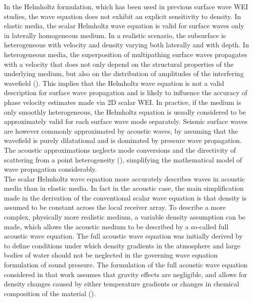 \documentclass{article}
\begin{document}
	In the Helmholtz formulation, which has been used in previous surface wave WEI studies, the wave equation does not exhibit an explicit sensitivity to density. In elastic media, the scalar Helmholtz wave equation is valid for surface waves only in laterally homogeneous medium. In a realistic scenario, the subsurface is heterogeneous with velocity and density varying both laterally and with depth. In heterogeneous media, the superposition of multipathing surface waves propagates with a velocity that does not only depend on the structural properties of the underlying medium, but also on the distribution of amplitudes of the interfering wavefield (\cite{wielandt2}). This implies that the Helmholtz wave equation is not a valid description for surface wave propagation and is likely to influence the accuracy of phase velocity estimates made via 2D scalar WEI. In practice, if the medium is only smoothly heterogeneous, the Helmholtz equation is usually considered to be approximately valid for each surface wave mode separately. Seismic surface waves are however commonly approximated by acoustic waves, by assuming that the wavefield is purely dilatational and is dominated by pressure wave propagation. The acoustic approximations neglects mode conversions and the directivity of scattering from a point heterogeneity  (\cite{wielandt2}), simplifying the mathematical model of wave propagation considerably. \\
	
	The scalar Helmholtz wave equation more accurately describes waves in acoustic media than in elastic media. In fact in the acoustic case, the main simplification made in the derivation of the conventional scalar wave equation is that density is assumed to be constant across the local receiver array. To describe a more complex, physically more realistic medium, a variable density assumption can be made, which allows the acoustic medium to be described by a so-called full acoustic wave equation. The full acoustic wave equation was initially derived by \textcite{bergmann1946wave} to define conditions under which density gradients in the atmosphere and large bodies of water should not be neglected in the governing wave equation formulation of sound pressure. The formulation of the full acoustic wave equation considered in that work assumes that gravity effects are negligible, and allows for density changes caused by either temperature gradients or changes in chemical composition of the material (\cite{bergmann1946wave}).\\ %
	
\end{document}
